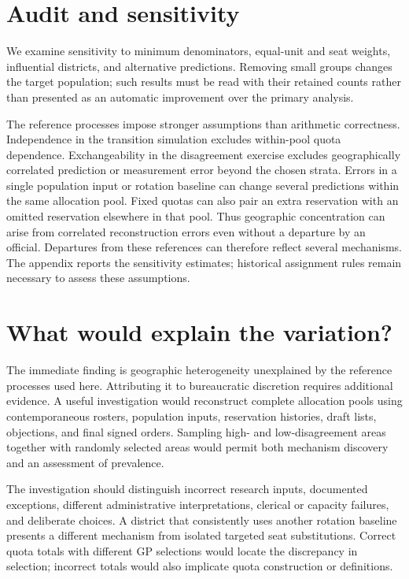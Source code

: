 \documentclass[11pt]{article}
\begin{document}
\section{Audit and sensitivity}
We examine sensitivity to minimum denominators, equal-unit and seat weights, influential districts, and alternative predictions. Removing small groups changes the target population; such results must be read with their retained counts rather than presented as an automatic improvement over the primary analysis.

The reference processes impose stronger assumptions than arithmetic correctness. Independence in the transition simulation excludes within-pool quota dependence. Exchangeability in the disagreement exercise excludes geographically correlated prediction or measurement error beyond the chosen strata. Errors in a single population input or rotation baseline can change several predictions within the same allocation pool. Fixed quotas can also pair an extra reservation with an omitted reservation elsewhere in that pool. Thus geographic concentration can arise from correlated reconstruction errors even without a departure by an official. Departures from these references can therefore reflect several mechanisms. The appendix reports the sensitivity estimates; historical assignment rules remain necessary to assess these assumptions.


\section{What would explain the variation?}
The immediate finding is geographic heterogeneity unexplained by the reference processes used here. Attributing it to bureaucratic discretion requires additional evidence. A useful investigation would reconstruct complete allocation pools using contemporaneous rosters, population inputs, reservation histories, draft lists, objections, and final signed orders. Sampling high- and low-disagreement areas together with randomly selected areas would permit both mechanism discovery and an assessment of prevalence.

The investigation should distinguish incorrect research inputs, documented exceptions, different administrative interpretations, clerical or capacity failures, and deliberate choices. A district that consistently uses another rotation baseline presents a different mechanism from isolated targeted seat substitutions. Correct quota totals with different GP selections would locate the discrepancy in selection; incorrect totals would also implicate quota construction or definitions.
\end{document}
